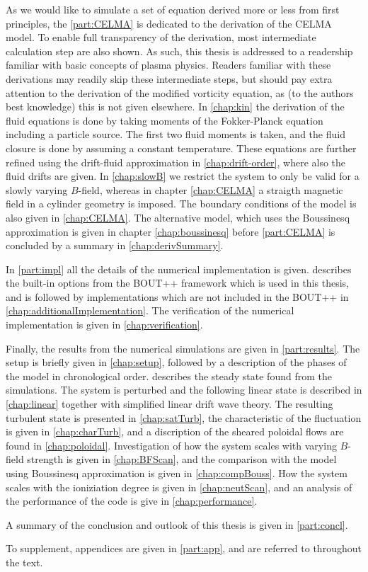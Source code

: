 As we would like to simulate a set of equation derived more or less from first principles, the \cref{part:CELMA} is dedicated to the derivation of the CELMA model.
To enable full transparency of the derivation, most intermediate calculation step are also shown.
As such, this thesis is addressed to a readership familiar with basic concepts of plasma physics.
Readers familiar with these derivations may readily skip these intermediate steps, but should pay extra attention to the derivation of the modified vorticity equation, as (to the authors best knowledge) this is not given elsewhere.
In \cref{chap:kin} the derivation of the fluid equations is done by taking moments of the Fokker-Planck equation including a particle source.
The first two fluid moments is taken, and the fluid closure is done by assuming a constant temperature.
These equations are further refined using the drift-fluid approximation in \cref{chap:drift-order}, where also the fluid drifts are given.
In \cref{chap:slowB} we restrict the system to only be valid for a slowly varying $B$-field, whereas in chapter \cref{chap:CELMA} a straigth magnetic field in a cylinder geometry is imposed.
The boundary conditions of the model is also given in \cref{chap:CELMA}.
The alternative model, which uses the Boussinesq approximation is given in chapter \cref{chap:boussinesq} before \cref{part:CELMA} is concluded by a summary in \cref{chap:derivSummary}.

In \cref{part:impl} all the details of the numerical implementation is given.
 describes the built-in options from the BOUT++ framework which is used in this thesis, and is followed by implementations which are not included in the BOUT++ in \cref{chap:additionalImplementation}.
The verification of the numerical implementation is given in \cref{chap:verification}.

Finally, the results from the numerical simulations are given in \cref{part:results}.
The setup is briefly given in \cref{chap:setup}, followed by a description of the phases of the model in chronological order.
 describes the steady state found from the simulations.
The system is perturbed and the following linear state is described in \cref{chap:linear} together with simplified linear drift wave theory.
The resulting turbulent state is presented in \cref{chap:satTurb}, the characteristic of the fluctuation is given in \cref{chap:charTurb}, and a discription of the sheared poloidal flows are found in \cref{chap:poloidal}.
Investigation of how the system scales with varying $B$-field strength is given in \cref{chap:BFScan}, and the comparison with the model using Boussinesq approximation is given in \cref{chap:compBouss}.
How the system scales with the ioniziation degree is given in \cref{chap:neutScan}, and an analysis of the performance of the code is give in \cref{chap:performance}.

A summary of the conclusion and outlook of this thesis is given in \cref{part:concl}.

To supplement, appendices are given in \cref{part:app}, and are referred to throughout the text.
